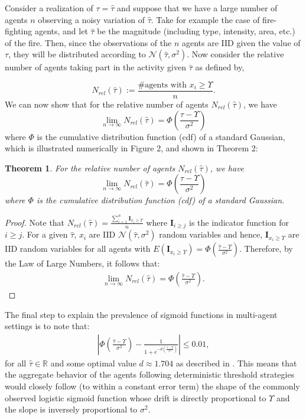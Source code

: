 \documentclass[12pt]{book}
\newtheorem{theorem}{Theorem}
\newcommand{\R}{\mathbb{R}}    %
\newcommand{\td}{\Upsilon}   %
\begin{document}
Consider a realization of $\tau=\hat{\tau}$ and suppose that we have a large number of agents $n$ observing a noisy variation of $\hat{\tau}$. Take for example the case of fire-fighting agents, and let $\hat{\tau}$ be the magnitude (including type, intensity, area, etc.) of the fire. Then, since the observations of the $n$ agents are IID given the value of $\tau$, they will be distributed according to $\mathcal{N}(\hat{\tau},\sigma^2)$. Now consider the relative number of agents taking part in the activity given $\hat{\tau}$ as defined by,

\begin{equation*}
	N_{rel}(\hat{\tau}):=\frac{\#\text{agents with }x_i\geq \td}{n}.
\end{equation*}
We can now show that for the relative number of agents $N_{rel}(\hat{\tau})$, we have
\begin{equation}
\lim_{n\to\infty}N_{rel}(\hat{\tau})=\Phi(\frac{\hat{\tau}-\td}{\sigma^2})
\end{equation}
where $\Phi$ is the cumulative distribution function (cdf) of a standard Gaussian, which is illustrated numerically in Figure 2, and shown in Theorem 2:  

\begin{theorem}\label{thrm:relativefrequency}
For the relative number of agents $N_{rel}(\hat{\tau})$, we have
\begin{equation}\label{eq:drtcrt}
\lim_{n\to\infty}N_{rel}(\hat{\tau})=\Phi(\frac{\hat{\tau}-\td}{\sigma^2})
\end{equation}
where $\Phi$ is the cumulative distribution function (cdf) of a standard Gaussian. 
\end{theorem}
\begin{proof}
Note that $N_{rel}(\hat{\tau})=\frac{\sum_{i=1}^n\mathbf{I}_{x_i\geq \td}}{n}$ where $\mathbf{I}_{i\geq j}$ is the indicator function for $i\geq j$. For a given $\hat{\tau}$, $x_i$ are IID $\mathcal{N}(\hat{\tau},\sigma^2)$ random variables and hence, $\mathbf{I}_{x_i\geq \td}$ are IID random variables for all agents with $E(\mathbf{I}_{x_i\geq \td})=\Phi(\frac{\hat{\tau}-\td}{\sigma^2})$. Therefore, by the Law of Large Numbers, it follows that:
\begin{align}
\lim_{n\to\infty}N_{rel}(\hat{\tau})=\Phi(\frac{\hat{\tau}-\td}{\sigma^2}).
\end{align}
\end{proof}

The final step to explain the prevalence of sigmoid functions in multi-agent settings is to note that:
\begin{align}
|\Phi(\frac{\hat{\tau}-\td}{\sigma^2})-\frac{1}{1+e^{-d(\frac{\hat{\tau}-\td}{\sigma^2})}}|\leq 0.01,
\end{align}
for all $\hat{\tau}\in\R$ and some optimal value $d\approx 1.704$ as described in \cite{Camilli1994}. This means that the aggregate behavior of the agents following deterministic threshold strategies would closely follow (to within a constant error term) the shape of the commonly observed logistic sigmoid function whose drift is directly proportional to $\td$ and the slope is inversely proportional to $\sigma^2$. 
\end{document}
